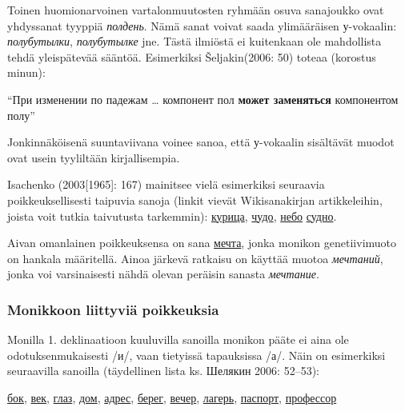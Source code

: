 \documentclass[]{scrartcl}
\begin{document}
Toinen huomionarvoinen vartalonmuutosten ryhmään osuva sanajoukko ovat
yhdyssanat tyyppiä \emph{полдень}. Nämä sanat voivat saada ylimääräisen
у-vokaalin: \emph{полубутылки}, \emph{полубутылке} jne. Tästä ilmiöstä
ei kuitenkaan ole mahdollista tehdä yleispätevää sääntöä. Esimerkiksi
Šeljakin(2006: 50) toteaa (korostus minun):

``При изменении по падежам \ldots{} компонент пол \textbf{может
заменяться} компонентом полу''

Jonkinnäköisenä suuntaviivana voinee sanoa, että у-vokaalin sisältävät
muodot ovat usein tyyliltään kirjallisempia.

Isachenko (2003{[}1965{]}: 167) mainitsee vielä esimerkiksi seuraavia
poikkeuksellisesti taipuvia sanoja (linkit vievät Wikisanakirjan
artikkeleihin, joista voit tutkia taivutusta tarkemmin):
\href{https://ru.wiktionary.org/wiki/\%D0\%BA\%D1\%83\%D1\%80\%D0\%B8\%D1\%86\%D0\%B0}{курица},
\href{https://ru.wiktionary.org/wiki/\%D1\%87\%D1\%83\%D0\%B4\%D0\%BE}{чудо},
\href{https://ru.wiktionary.org/wiki/\%D0\%BD\%D0\%B5\%D0\%B1\%D0\%BE}{небо}
\href{https://ru.wiktionary.org/wiki/\%D1\%81\%D1\%83\%D0\%B4\%D0\%BD\%D0\%BE}{судно}.

Aivan omanlainen poikkeuksensa on sana
\href{https://ru.wiktionary.org/wiki/\%D0\%BC\%D0\%B5\%D1\%87\%D1\%82\%D0\%B0}{мечта},
jonka monikon genetiivimuoto on hankala määritellä. Ainoa järkevä
ratkaisu on käyttää muotoa \emph{мечтаний}, jonka voi varsinaisesti
nähdä olevan peräisin sanasta \emph{мечтание}.

\subsubsection{Monikkoon liittyviä
poikkeuksia}\label{monikkoon-liittyviuxe4-poikkeuksia}

Monilla 1. deklinaatioon kuuluvilla sanoilla monikon pääte ei aina ole
odotuksenmukaisesti /и/, vaan tietyissä tapauksissa /а/. Näin on
esimerkiksi seuraavilla sanoilla (täydellinen lista ks. Шелякин 2006:
52--53):

\href{https://ru.wiktionary.org/wiki/\%D0\%B1\%D0\%BE\%D0\%BA}{бок},
\href{https://ru.wiktionary.org/wiki/\%D0\%B2\%D0\%B5\%D0\%BA}{век},
\href{https://ru.wiktionary.org/wiki/\%D0\%B3\%D0\%BB\%D0\%B0\%D0\%B7}{глаз},
\href{https://ru.wiktionary.org/wiki/\%D0\%B4\%D0\%BE\%D0\%BC}{дом},
\href{https://ru.wiktionary.org/wiki/\%D0\%B0\%D0\%B4\%D1\%80\%D0\%B5\%D1\%81}{адрес},
\href{https://ru.wiktionary.org/wiki/\%D0\%B1\%D0\%B5\%D1\%80\%D0\%B5\%D0\%B3}{берег},
\href{https://ru.wiktionary.org/wiki/\%D0\%B2\%D0\%B5\%D1\%87\%D0\%B5\%D1\%80}{вечер},
\href{https://ru.wiktionary.org/wiki/\%D0\%BB\%D0\%B0\%D0\%B3\%D0\%B5\%D1\%80\%D1\%8C}{лагерь},
\href{https://ru.wiktionary.org/wiki/\%D0\%BF\%D0\%B0\%D1\%81\%D0\%BF\%D0\%BE\%D1\%80\%D1\%82}{паспорт},
\href{https://ru.wiktionary.org/wiki/\%D0\%BF\%D1\%80\%D0\%BE\%D1\%84\%D0\%B5\%D1\%81\%D1\%81\%D0\%BE\%D1\%80}{профессор}
\end{document}
